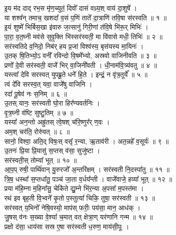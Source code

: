 \section{}
इ॒य म॑द दाद् रभ॒स मृ॑ण॒च्युतं॒ दिवो᳚ दासं वध्र्य॒श् वाय॑ दा॒शुषे᳚ ।\\
या शश्व᳚न् तमाच॒ खशदा᳚ व॒सं प॒णिं ताते᳚ दा॒त्राणि॑ तवि॒षा स॑रस्वति ॥ १ ॥\\
इ॒यं शुष्मे᳚ भिर्बिस॒खा इ॑वारु ज॒त्सानु॑ गिरी॒णां त॑वि॒षे भि॑रू॒र् मिभिः॑ ।\\
पा॒रा॒ व॒त॒घ्नी मव॑से सुवृ॒क्ति भि॑स्सर॑स्वती॒ मा वि॑वासे मधी॒ तिभिः॑ ॥ २ ॥\\
सर॑स्वतिदे व॒निदो॒ निब॑र् हय प्र॒जां विश्व॑स्य॒ बृस॑यस्य मा॒यिनः॑ ।\\
उ॒तक् षि॒तिभ्यो॒ऽ वनी᳚ रविन्दो वि॒षमे᳚भ्यो, अस्रवो वाजिनीवति ॥ ३ ॥\\
प्रणो᳚ दे॒वी सर॑स्वती॒ वाजे᳚ भिर् वा॒जिनी᳚वती । धी॒नाम॑वि॒त्र्य॑वतु ॥ ४ ॥\\
यस्त्वा᳚ देवि सरस्वत् युपब्रू॒ते धने᳚ हि॒ते । इन्द्रं॒ न वृ॑त्र॒तूर्ये᳚ ॥ ५ ॥\\
त्वं दे᳚वि सरस्व॒त् यवा॒ वाजे᳚षु वाजिनि ।\\
रदा᳚ पू॒षेव॑ नः स॒निम् ॥ ६ ॥\\
उ॒तस् यानः॒ सर॑स्वती घो॒रा हिर᳚ण्यवर्तनिः ।\\
वृ॒त्र॒घ्नी व॑ष्टि सुष्टु॒तिम् ॥ ७ ॥\\
यस्या᳚ अन॒न्तो अह्रु॑तस् त्वे॒षश् च॑रि॒ष्णुर᳚र् ण॒वः ।\\
अम॒श् चर॑ति॒ रोरु॑वत् ॥ ८ ॥\\
सानो॒ विश्वा॒ अति॒द् विषः॒स् वसृ᳚ र॒न्या, ऋ॒ताव॑री । अत॒न्नहे᳚ व॒सूर्यः॑ ॥ ९ ॥\\
उ॒तनः॑ प्रि॒या प्रि॒यासु॑ स॒प्तस् व॑सा॒ सुजु॑ष्टा ।\\
सर॑स्वती॒स् तोम्या᳚ भूत् ॥ १० ॥\\
आ॒प॒प् रुषी॒ पार्थि॑वान् यु॒रुरजो᳚ अ॒न्तरि॑क्षम् । सर॑स्वती नि॒दस्पा᳚तु ॥ ११ ॥\\
त्रि॒ष॒ धस्था᳚ स॒प्तधा᳚तु॒ पञ्च॑ जा॒ता व॒र्धय᳚न्ती । वाजे᳚वाजे॒ हव्या᳚ भूत् ॥ १२ ॥\\
प्रया म॑हि॒म्ना म॒हिना᳚सु॒ चेकि॑ते द्यु॒म्ने भि॑र॒न्या अ॒पसा᳚ म॒पस्त॑मा ।\\
रथ॑ इव बृह॒ती वि॒भ्वने᳚ कृ॒तो प॒स्तुत्या᳚ चिकि॒ तुषा॒ सर॑स्वती ॥ १३ ॥\\
सर॑स्वत् य॒भिनो᳚ नेषि॒वस्यो॒ माप॑स् फरीः॒ पय॑सा॒ मान॒ आध॑क् ।\\
जु॒षस् व॑नः स॒ख्या वे॒श्या᳚ च॒मात् वत् क्षेत्रा॒ण् यर॑णानि गन्म ॥ १४ ॥\\
प्रक्षो द॑सा॒ धाय॑सा सस्र ए॒षा सर॑स्वती ध॒रुण॒ माय॑सी॒पूः ।\\
